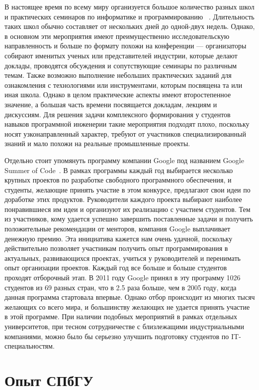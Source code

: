 \documentclass[a4paper]{article}
\begin{document}
В настоящее время по всему миру организуется большое количество разных школ и практических семинаров по информатике и программированию ~\cite{schoolList}. Длительность таких школ обычно составляет от нескольких дней до одной-двух недель. Однако, в основном эти мероприятия имеют преимущественно исследовательскую направленность  и больше по формату похожи на конференции --- организаторы собирают именитых ученых или представителей индустрии, которые делают доклады, проводятся обсуждения и сопутствующие семинары по различным темам. Также возможно выполнение небольших практических заданий для ознакомления с технологиями или инструментами, которым посвящена та или иная школа. Однако в целом практические аспекты имеют второстепенное значение, а большая часть времени посвящается докладам, лекциям и дискуссиям. Для решения задачи комплексного формирования у студентов навыков программной инженерии такие мероприятия подходят плохо, поскольку носят узконаправленный характер, требуют от участников специализированный знаний и мало похожи на  реальные промышленные проекты.

Отдельно стоит упомянуть программу компании Google под названием Google Summer of Code~\cite{google}. В рамках программы каждый год выбирается несколько крупных проектов по разработке свободного программного обеспечения, и студенты, желающие принять участие в этом конкурсе, предлагают свои идеи по доработке этих продуктов. Руководители каждого проекта выбирают наиболее понравившиеся им идеи и организуют их реализацию с участием студентов. Тем из участников, кому удается успешно завершить поставленные задачи и получить положительные рекомендации от менторов, компания Google выплачивает денежную премию. Эта инициатива  кажется нам очень удачной, поскольку действительно позволяет участникам получить опыт программирования в актуальных, развивающихся проектах, учиться у руководителей и перенимать опыт организации проектов. Каждый год все больше и больше студентов проходят отборочный этап.  В 2011 году Google принял в эту программу 1026 студентов из 69 разных стран, что в 2.5 раза больше, чем в 2005 году, когда данная программа стартовала впервые. Однако отбор происходит из многих тысяч желающих со всего мира, и большинству желающих не удается принять участие в этой программе. При наличии подобных мероприятий в рамках отдельных университетов, при тесном сотрудничестве с близлежащими индустриальными компаниями, можно было бы серьезно улучшить подготовку студентов по IT-специальностям.

\section{Опыт СПбГУ}
\end{document}

